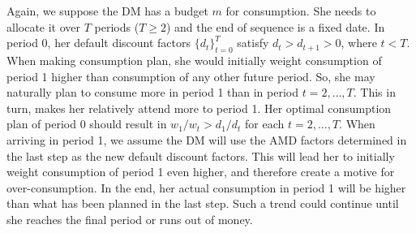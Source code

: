 \documentclass[
  12pt,
]{article}
\begin{document}
Again, we suppose the DM has a budget \(m\) for consumption. She needs
to allocate it over \(T\) periods (\(T\geq 2\)) and the end of sequence
is a fixed date. In period 0, her default discount factors
\(\{d_t\}_{t=0}^T\) satisfy \(d_t>d_{t+1}>0\), where \(t<T\). When
making consumption plan, she would initially weight consumption of
period 1 higher than consumption of any other future period. So, she may
naturally plan to consume more in period 1 than in period \(t=2,…,T\).
This in turn, makes her relatively attend more to period 1. Her optimal
consumption plan of period 0 should result in \(w_1/w_t>d_1/d_t\) for
each \(t=2,…,T\). When arriving in period 1, we assume the DM will use
the AMD factors determined in the last step as the new default discount
factors. This will lead her to initially weight consumption of period 1
even higher, and therefore create a motive for over-consumption. In the
end, her actual consumption in period 1 will be higher than what has
been planned in the last step. Such a trend could continue until she
reaches the final period or runs out of money.
\end{document}
